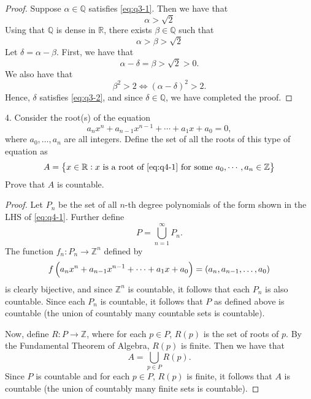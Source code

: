 \documentclass{article}
\newcommand{\Z}{\mathbb{Z}}
\newcommand{\Q}{\mathbb{Q}}
\newcommand{\R}{\mathbb{R}}
\begin{document}
\begin{proof}

Suppose $\alpha \in \Q$ satisfies \eqref{eq:q3-1}. Then we have that
%
\begin{equation*}
    \alpha > \sqrt 2
\end{equation*}
%
Using that $\Q$ is dense in $\R$, there exists $\beta \in \Q$ such that
%
\begin{equation*}
    \alpha > \beta > \sqrt 2
\end{equation*}
%
Let $\delta = \alpha - \beta$. First, we have that
%
\begin{equation*}
    \alpha - \delta = \beta > \sqrt 2 > 0
    .
\end{equation*}
%
We also have that
%
\begin{equation*}
    \beta^2 > 2
    \iff (\alpha - \delta)^2 > 2
    .
\end{equation*}
%
Hence, $\delta$ satisfies \eqref{eq:q3-2}, and since $\delta \in \Q$, we
have completed the proof.

\end{proof}

\newpage

4. Consider the root(s) of the equation
%
\begin{equation}
    a_n x^n + a_{n-1} x^{n-1} + \cdots + a_1 x + a_0 = 0
    ,
    \label{eq:q4-1}
\end{equation}
%
where $a_0, \ldots, a_n$ are all integers. Define the set of all the
roots of this type of equation as
%
\begin{equation*}
    A = \cbr{x \in \R : \text{$x$ is a root of \eqref{eq:q4-1} for some $a_0, \cdots, a_n \in \Z$}}
\end{equation*}
%
Prove that $A$ is countable.

\begin{proof}

Let $P_n$ be the set of all $n$-th degree polynomials of the form shown
in the LHS of \eqref{eq:q4-1}. Further define
%
\begin{equation*}
    P = \bigcup_{n = 1}^{\infty} P_n
    .
\end{equation*}
%
The function $f_n: P_n \to \Z^n$ defined by
%
\begin{equation*}
    f\del{a_n x^n + a_{n-1} x^{n-1} + \cdots + a_1 x + a_0} = \del{a_n, a_{n-1}, \ldots, a_0}
\end{equation*}
%
is clearly bijective, and since $\Z^n$ is countable, it follows that
each $P_n$ is also countable. Since each $P_n$ is countable, it follows
that $P$ as defined above is countable (the union of countably many
countable sets is countable).

Now, define $R: P \to \Z$, where for each $p \in P$, $R(p)$ is the set
of roots of $p$. By the Fundamental Theorem of Algebra, $R(p)$ is
finite. Then we have that
%
\begin{equation*}
    A = \bigcup_{p \in P} R(p)
    .
\end{equation*}
%
Since $P$ is countable and for each $p \in P$, $R(p)$ is finite, it
follows that $A$ is countable (the union of countably many finite sets
is countable).

\end{proof}
\end{document}
